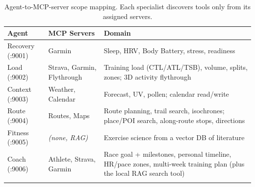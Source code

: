 \begin{table}[ht]
\begin{center}
\begin{minipage}{\textwidth}
\caption[Agent--MCP scope mapping]{Agent-to-MCP-server scope mapping. Each specialist discovers tools only from its assigned servers.}\label{tab:agent_scope}
\begin{tabularx}{\textwidth}{llX}
\toprule
\textbf{Agent} & \textbf{MCP Servers} & \textbf{Domain} \\
\midrule
Recovery (:9001) & Garmin & Sleep, HRV, Body Battery, stress, readiness \\
Load (:9002) & Strava, Garmin, Flythrough & Training load (CTL/ATL/TSB), volume, splits, zones; 3D activity flythrough \\
Context (:9003) & Weather, Calendar & Forecast, UV, pollen; calendar read/write \\
Route (:9004) & Routes, Maps & Route planning, trail search, isochrones; place/POI search, along-route stops, directions \\
Fitness (:9005) & \textit{(none, RAG)} & Exercise science from a vector DB of literature \\
Coach (:9006) & Athlete, Strava, Garmin & Race goal + milestones, personal timeline, HR/pace zones, multi-week training plan (plus the local RAG search tool) \\
\botrule
\end{tabularx}
\end{minipage}
\end{center}
\end{table}
